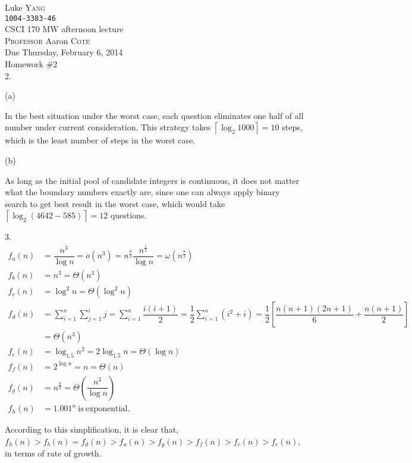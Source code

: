 \documentclass[UTF8,12pt,letterpaper,oneside]{amsart}
\begin{document}
\noindent Luke \textsc{Yang}\\
\texttt{1004-3383-46}\\
CSCI 170 MW afternoon lecture\\
\textsc{Professor} Aaron \textsc{Cote}\\
Due Thursday, February 6, 2014\\
Homework \#2\\

2. 

(a)

In the best situation under the worst case, each question eliminates one half of all number under current consideration. This strategy takes $\left \lceil \log_2 1000 \right \rceil = 10$ steps, which is the least number of steps in the worst case.

(b)

As long as the initial pool of candidate integers is continuous, it does not matter what the boundary numbers exactly are, since one can always apply binary search to get best result in the worst case, which would take $\left \lceil \log_2 (4642 - 585) \right \rceil = 12$ questions.

3.
\begin{equation*}\begin{split}
f_a (n) &= \dfrac{n^3}{\log n} = o(n^3) = n^{\tfrac{8}{3}} \dfrac{n^{\tfrac{1}{3}}}{\log n} = \omega(n^{\tfrac{8}{3}})\\
f_b (n) &= n^3 = \Theta(n^3)\\
f_c (n) &= \log^2 n = \Theta(\log^2 n)\\
f_d (n) &= \sum_{i = 1}^n \sum_{j = 1}^i j = \sum_{i = 1}^n \dfrac{i(i + 1)}{2} = \dfrac{1}{2} \sum_{i = 1}^n \left(  i^2 + i \right) = \dfrac{1}{2} \left[ \dfrac{n(n + 1)(2n + 1)}{6} + \dfrac{n(n + 1)}{2} \right]\\&= \Theta(n^3)\\
f_e (n) &= \log_{1.5} n^2 = 2 \log_{1.5} n = \Theta(\log n)\\
f_f (n) &= 2^{\log n} = n = \Theta(n)\\
f_g (n) &= n^{\tfrac{8}{3}} = \Theta\left( \dfrac{n^3}{\log n} \right)\\
f_h (n) &= 1.001^n\mathrm{\ is\ exponential.}
\end{split}\end{equation*}

According to this simplification, it is clear that, $f_h (n) > f_b (n) = f_d(n) > f_a (n) > f_g (n) > f_f (n) > f_c (n) > f_e (n)$, in terms of rate of growth.
\end{document}
